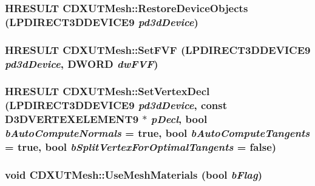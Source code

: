 \label{class_c_d_x_u_t_mesh_a55ce28dfc8c207496925bf757819b4dd}
\hypertarget{class_c_d_x_u_t_mesh_a76933c7491aa30b0b96cdb6b336987a1}{
\subsubsection[{RestoreDeviceObjects}]{\setlength{\rightskip}{0pt plus 5cm}HRESULT CDXUTMesh::RestoreDeviceObjects (LPDIRECT3DDEVICE9 {\em pd3dDevice})}}
\label{class_c_d_x_u_t_mesh_a76933c7491aa30b0b96cdb6b336987a1}
\hypertarget{class_c_d_x_u_t_mesh_a1b5df189a3d243da983d4afa2636068b}{
\subsubsection[{SetFVF}]{\setlength{\rightskip}{0pt plus 5cm}HRESULT CDXUTMesh::SetFVF (LPDIRECT3DDEVICE9 {\em pd3dDevice}, \/  DWORD {\em dwFVF})}}
\label{class_c_d_x_u_t_mesh_a1b5df189a3d243da983d4afa2636068b}
\hypertarget{class_c_d_x_u_t_mesh_a49ef2ffb882b26cae6925f0c539dd804}{
\subsubsection[{SetVertexDecl}]{\setlength{\rightskip}{0pt plus 5cm}HRESULT CDXUTMesh::SetVertexDecl (LPDIRECT3DDEVICE9 {\em pd3dDevice}, \/  const D3DVERTEXELEMENT9 $\ast$ {\em pDecl}, \/  bool {\em bAutoComputeNormals} = {\ttfamily true}, \/  bool {\em bAutoComputeTangents} = {\ttfamily true}, \/  bool {\em bSplitVertexForOptimalTangents} = {\ttfamily false})}}
\label{class_c_d_x_u_t_mesh_a49ef2ffb882b26cae6925f0c539dd804}
\hypertarget{class_c_d_x_u_t_mesh_ab5b2b54044783960656a44b5706300f8}{
\subsubsection[{UseMeshMaterials}]{\setlength{\rightskip}{0pt plus 5cm}void CDXUTMesh::UseMeshMaterials (bool {\em bFlag})}}
\label{class_c_d_x_u_t_mesh_ab5b2b54044783960656a44b5706300f8}


